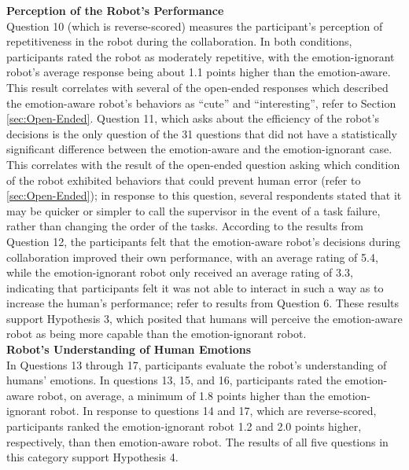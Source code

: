\documentclass[12pt]{report}
\begin{document}
\hspace*{-8mm} \textbf{Perception of the Robot's Performance} 
\label{sec:Performance}
\\Question 10 (which is reverse-scored) measures the participant's perception of
repetitiveness in the robot during the collaboration. In both conditions,
participants rated the robot as moderately repetitive, with the emotion-ignorant
robot's average response being about 1.1 points higher than the emotion-aware.
This result correlates with several of the open-ended responses which described
the emotion-aware robot's behaviors as ``cute'' and ``interesting'', refer to
Section \ref{sec:Open-Ended}. Question 11, which asks about the efficiency of
the robot's decisions is the only question of the 31 questions that did not have
a statistically significant difference between the emotion-aware and the
emotion-ignorant case. This correlates with the result of the open-ended
question asking which condition of the robot exhibited behaviors that could
prevent human error (refer to \ref{sec:Open-Ended}); in response to this
question, several respondents stated that it may be quicker or simpler to call
the supervisor in the event of a task failure, rather than changing the order of
the tasks. According to the results from Question 12, the participants felt that
the emotion-aware robot's decisions during collaboration improved their own
performance, with an average rating of 5.4, while the emotion-ignorant robot
only received an average rating of 3.3, indicating that participants felt it was
not able to interact in such a way as to increase the human's performance; refer
to results from Question 6. These results support Hypothesis 3, which posited
that humans will perceive the emotion-aware robot as being more capable than the
emotion-ignorant robot. \\

\hspace*{-8mm} \textbf{Robot's Understanding of Human Emotions} 
\label{sec:Emotions}
\\In Questions 13 through 17, participants evaluate the robot's understanding of
humans' emotions. In questions 13, 15, and 16, participants rated the
emotion-aware robot, on average, a minimum of 1.8 points higher than the
emotion-ignorant robot. In response to questions 14 and 17, which are
reverse-scored, participants ranked the emotion-ignorant robot 1.2 and 2.0
points higher, respectively, than then emotion-aware robot. The results
of all five questions in this category support Hypothesis 4. \\
\end{document}
